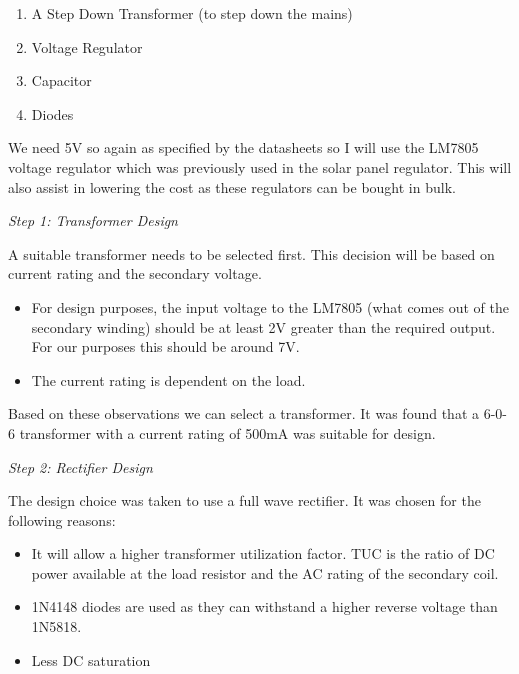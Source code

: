 \begin{enumerate}
\item A Step Down Transformer (to step down the mains)
\item Voltage Regulator
\item Capacitor
\item Diodes
\end{enumerate}

We need 5V so again as specified by the datasheets so I will use the LM7805 voltage regulator which
was previously used in the solar panel regulator. This will also assist in lowering the cost as these
regulators can be bought in bulk.

\textit{Step 1: Transformer Design}

A suitable transformer needs to be selected first. This decision will be based on current rating and
the secondary voltage.

\begin{itemize}
\item For design purposes, the input voltage to the LM7805 (what comes out of the secondary
winding) should be at least 2V greater than the required output. For our purposes this
should be around 7V.
\item The current rating is dependent on the load.
\end{itemize}

Based on these observations we can select a transformer. It was found that a 6-0-6 transformer with
a current rating of 500mA was suitable for design.

\textit{Step 2: Rectifier Design}

The design choice was taken to use a full wave rectifier. It was chosen for the following reasons:

\begin{itemize}
\item It will allow a higher transformer utilization factor. TUC is the ratio of DC power available at
the load resistor and the AC rating of the secondary coil.
\item 1N4148 diodes are used as they can withstand a higher reverse voltage than 1N5818.
\item Less DC saturation
\end{itemize}

